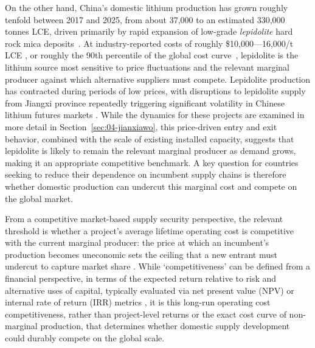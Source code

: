 \documentclass{article}
\renewcommand\_{\textunderscore\allowbreak}
\begin{document}
On the other hand, China's domestic lithium production has grown roughly tenfold between 2017 and 2025, from about 37,000 to an estimated 330,000 tonnes LCE, driven primarily by rapid expansion of low-grade \textit{lepidolite} hard rock mica deposits~\cite{benchmarkteamRestartCATLsJianxiawo2026, usgeologicalsurveyMineralCommoditySummaries2026}. At industry-reported costs of roughly \$10,000---16,000/t LCE \cite{liuChinaLithiumBoom2024, atkinsonLithiumPriceReversion2023, jamasmieCATLCutLithium2024}, or roughly the 90th percentile of the global cost curve~\cite{sulcaLithiumPricesWhere2024}, lepidolite is the lithium source most sensitive to price fluctuations and the relevant marginal producer against which alternative suppliers must compete. Lepidolite production has contracted during periods of low prices, with disruptions to lepidolite supply from Jiangxi province repeatedly triggering significant volatility in Chinese lithium futures markets \cite{liChinasCATLSuspends2025, benchmarkteamRestartCATLsJianxiawo2026}. While the dynamics for these projects are examined in more detail in Section~\ref{sec:04-jianxiawo}, this price-driven entry and exit behavior, combined with the scale of existing installed capacity, suggests that lepidolite is likely to remain the relevant marginal producer as demand grows, making it an appropriate competitive benchmark. A key question for countries seeking to reduce their dependence on incumbent supply chains is therefore whether domestic production can undercut this marginal cost and compete on the global market.

From a competitive market-based supply security perspective, the relevant threshold is whether a project's average lifetime operating cost is competitive with the current marginal producer: the price at which an incumbent's production becomes uneconomic sets the ceiling that a new entrant must undercut to capture market share \cite{tiltonMineralEconomicsPolicy2016}. While `competitiveness' can be defined from a financial perspective, in terms of the expected return relative to risk and alternative uses of capital, typically evaluated via net present value (NPV) or internal rate of return (IRR) metrics \cite{pindyckIrreversibilityUncertaintyInvestment1990, brennanEvaluatingNaturalResource1985}, it is this long-run operating cost competitiveness, rather than project-level returns or the exact cost curve of non-marginal production, that determines whether domestic supply development could durably compete on the global scale. 
\end{document}
